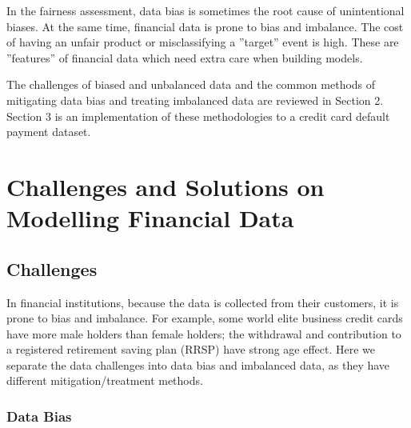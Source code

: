 \documentclass{article}
\begin{document}
In the fairness assessment, data bias is sometimes the root cause of unintentional biases. At the same time, financial data is prone to bias and imbalance. The cost of having an unfair product or misclassifying a ''target'' event is high. These are ''features'' of financial data which need extra care when building models.

The challenges of biased and unbalanced data and the common methods of mitigating data bias and treating imbalanced data are reviewed in Section 2. Section 3 is an implementation of these methodologies to a credit card default payment dataset. 

\section{Challenges and Solutions on Modelling Financial Data}
\subsection{Challenges}
In financial institutions, because the data is collected from their customers, it is prone to bias and imbalance. For example, some world elite business credit cards have more male holders than female holders; the withdrawal and contribution to a registered retirement saving plan (RRSP) have strong age effect.  Here we separate the data challenges into data bias and imbalanced data, as they have different mitigation/treatment methods.

\subsubsection{Data Bias}
\end{document}
